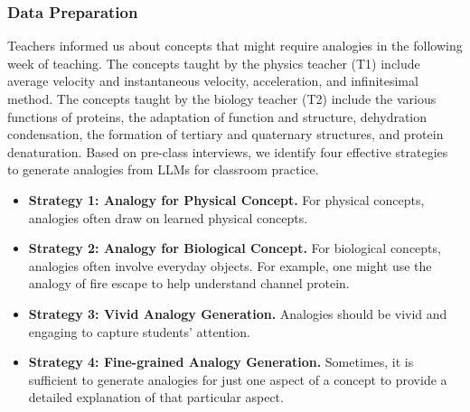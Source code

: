 \subsubsection{Data Preparation}
\label{sec:study22_data_preparation}
Teachers informed us about concepts that might require analogies in the following week of teaching.
The concepts taught by the physics teacher (T1) include average velocity and instantaneous velocity, acceleration, and infinitesimal method.
The concepts taught by the biology teacher (T2) include the various functions of proteins, the adaptation of function and structure, dehydration condensation, the formation of tertiary and quaternary structures, and protein denaturation.
Based on pre-class interviews, we identify four effective strategies to generate analogies from LLMs for classroom practice.


\begin{itemize}
    \item \textbf{Strategy 1: Analogy for Physical Concept.} For physical concepts, analogies often draw on learned physical concepts. 
    \item \textbf{Strategy 2: Analogy for Biological Concept.} For biological concepts, analogies often involve everyday objects. For example, one might use the analogy of fire escape to help understand channel protein.
    \item \textbf{Strategy 3: Vivid Analogy Generation.} Analogies should be vivid and engaging to capture students' attention. 
    \item \textbf{Strategy 4: Fine-grained Analogy Generation.} Sometimes, it is sufficient to generate analogies for just one aspect of a concept to provide a detailed explanation of that particular aspect. 
\end{itemize}



